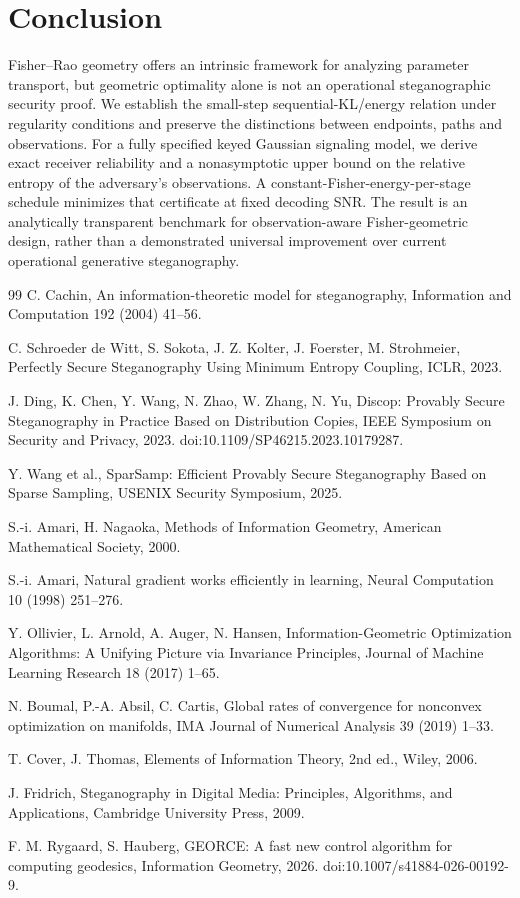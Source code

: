 \documentclass[preprint,12pt]{elsarticle}
\begin{document}
\section{Conclusion}
Fisher--Rao geometry offers an
intrinsic framework for analyzing
parameter transport, but geometric
optimality alone is not an operational
steganographic security proof.
We establish the small-step
sequential-KL/energy relation
under regularity conditions and
preserve the distinctions between
endpoints, paths and observations.
For a fully specified keyed Gaussian
signaling model, we derive exact
receiver reliability and a nonasymptotic
upper bound on the relative entropy of
the adversary's observations.
A constant-Fisher-energy-per-stage
schedule minimizes that certificate
at fixed decoding SNR. The result
is an analytically transparent
benchmark for observation-aware
Fisher-geometric design, rather than
a demonstrated universal improvement
over current operational generative
steganography.


\begin{thebibliography}{99}
C. Cachin, An information-theoretic model for steganography,
Information and Computation 192 (2004) 41--56.


C. Schroeder de Witt, S. Sokota, J. Z. Kolter, J. Foerster,
M. Strohmeier, Perfectly Secure Steganography Using
Minimum Entropy Coupling, ICLR, 2023.


J. Ding, K. Chen, Y. Wang, N. Zhao, W. Zhang, N. Yu,
Discop: Provably Secure Steganography in Practice
Based on Distribution Copies, IEEE Symposium on
Security and Privacy, 2023.
doi:10.1109/SP46215.2023.10179287.


Y. Wang et al., SparSamp: Efficient Provably Secure
Steganography Based on Sparse Sampling,
USENIX Security Symposium, 2025.


S.-i. Amari, H. Nagaoka,
Methods of Information Geometry,
American Mathematical Society, 2000.


S.-i. Amari, Natural gradient works efficiently
in learning, Neural Computation 10 (1998) 251--276.


Y. Ollivier, L. Arnold, A. Auger, N. Hansen,
Information-Geometric Optimization Algorithms:
A Unifying Picture via Invariance Principles,
Journal of Machine Learning Research 18 (2017) 1--65.


N. Boumal, P.-A. Absil, C. Cartis,
Global rates of convergence for nonconvex
optimization on manifolds,
IMA Journal of Numerical Analysis 39 (2019) 1--33.


T. Cover, J. Thomas, Elements of Information
Theory, 2nd ed., Wiley, 2006.


J. Fridrich, Steganography in Digital Media:
Principles, Algorithms, and Applications,
Cambridge University Press, 2009.


F. M. Rygaard, S. Hauberg,
GEORCE: A fast new control algorithm
for computing geodesics,
Information Geometry, 2026.
doi:10.1007/s41884-026-00192-9.
\end{thebibliography}
\end{document}
